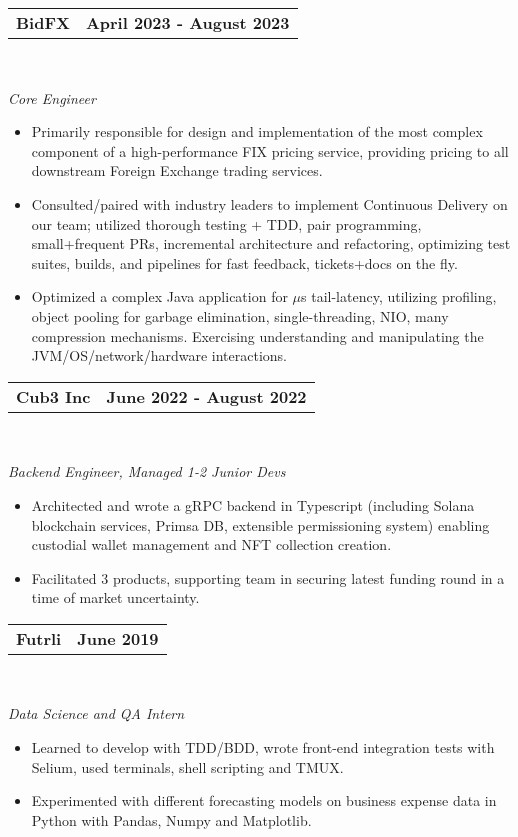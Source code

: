 \documentclass[letterpaper,oneside,10.8pt]{article}
\makeatletter
\newcommand{\titleAndDate}[2]{
  \small{
  \vspace{-1pt}
    \begin{tabular*}{1\textwidth}{l@{\extracolsep{\fill}}r}
      \textbf{#1} & \textbf{#2} \\
    \end{tabular*}\vspace{-1pt} \\
  }
}
\newcommand{\normalText}[1]{
  \small{
    {#1}
  }\vspace{-1pt}\\
}
\newcommand{\italicText}[1]{
  \small{
    \textit{#1}
  }\vspace{-1pt} \\
}
\makeatother
\begin{document}
  \titleAndDate{BidFX}{April 2023 - August 2023}
  \italicText{Core Engineer}
  \begin{itemize}[leftmargin=10pt]
    \vspace{-1pt}
    \item\normalText{Primarily responsible for design and implementation of the most complex component of a high-performance FIX pricing service, providing pricing to all downstream Foreign Exchange trading services.}
    \item\normalText{Consulted/paired with industry leaders to implement Continuous Delivery on our team; utilized thorough testing + TDD, pair programming, small+frequent PRs, incremental architecture and refactoring, optimizing test suites, builds, and pipelines for fast feedback, tickets+docs on the fly.}
    \item\normalText{Optimized a complex Java application for \begin{math}\mu\end{math}s tail-latency, utilizing profiling, object pooling for garbage elimination, single-threading, NIO, many compression mechanisms. Exercising understanding and manipulating the JVM/OS/network/hardware interactions.}
  \end{itemize}
  
  \vspace{4pt}
  
  \titleAndDate{Cub3 Inc}{June 2022 - August 2022}
  \italicText{Backend Engineer, Managed 1-2 Junior Devs}
  \begin{itemize}[leftmargin=10pt]
    \vspace{-1pt}
    \item\normalText{Architected and wrote a gRPC backend in Typescript (including Solana blockchain services, Primsa DB, extensible permissioning system) enabling custodial wallet management and NFT collection creation.}
    \item\normalText{Facilitated 3 products, supporting team in securing latest funding round in a time of market uncertainty.}
  \end{itemize}

  \vspace{4pt}
  
  \titleAndDate{Futrli}{June 2019}
  \italicText{Data Science and QA Intern}
  \begin{itemize}[leftmargin=10pt]
    \item\normalText{Learned to develop with TDD/BDD, wrote front-end integration tests with Selium, used terminals, shell scripting and TMUX.}
    \item\normalText{Experimented with different forecasting models on business expense data in Python with Pandas, Numpy and Matplotlib. }
  \end{itemize}
\end{document}
